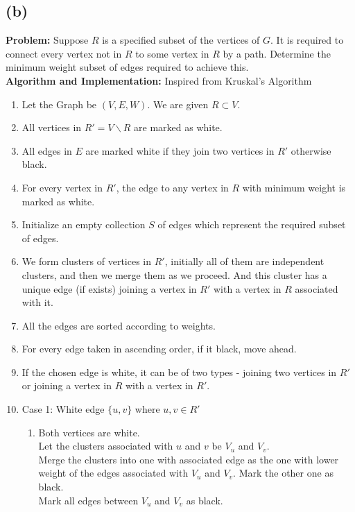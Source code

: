 \documentclass[11pt, fleqn]{article}
\begin{document}
\subsection*{(b)}

\textbf{Problem:} Suppose $R$ is a specified subset of the vertices of $G$. It is required to connect every vertex not in $R$ to some vertex in $R$ by a path. Determine the minimum weight subset of edges required to achieve this. \\
\textbf{Algorithm and Implementation:}
Inspired from Kruskal's Algorithm
\begin{enumerate}
    \item Let the Graph be $(V, E, W)$. We are given $R \subset V$.
    \item All vertices in $R' = V \backslash R$ are marked as white.
    \item All edges in $E$ are marked white if they join two vertices in $R'$ otherwise black.
    \item For every vertex in $R'$, the edge to any vertex in $R$ with minimum weight is marked as white.
    \item Initialize an empty collection $S$ of edges which represent the required subset of edges.
    \item We form clusters of vertices in $R'$, initially all of them are independent clusters, and then we merge them as we proceed. And this cluster has a unique edge (if exists) joining a vertex in $R'$ with a vertex in $R$ associated with it.
    \item All the edges are sorted according to weights.
    \item For every edge taken in ascending order, if it black, move ahead.
    \item If the chosen edge is white, it can be of two types - joining two vertices in $R'$ or joining a vertex in $R$ with a vertex in $R'$.
    \item Case 1: White edge $\{u, v\}$ where $u, v \in R'$
    \begin{enumerate}
        \item Both vertices are white.\\
        Let the clusters associated with $u$ and $v$ be $V_u$ and $V_v$.\\
        Merge the clusters into one with associated edge as the one with lower weight of the edges associated with $V_u$ and $V_v$. Mark the other one as black.\\
        Mark all edges between $V_u$ and $V_v$ as black. \\

\end{enumerate}
\end{enumerate}
\end{document}
